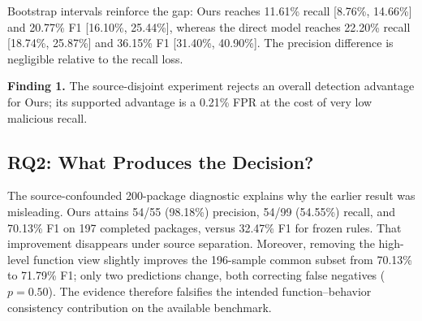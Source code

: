 \begin{table}[!t]
\centering
\caption{Source-disjoint results on 977 common successful packages. Counts
precede percentages; higher is better except FPR.}
\label{tab:source-disjoint}
\small
{}
\end{table}

Bootstrap intervals reinforce the gap: Ours reaches 11.61\% recall
[8.76\%, 14.66\%] and 20.77\% F1 [16.10\%, 25.44\%], whereas the direct model
reaches 22.20\% recall [18.74\%, 25.87\%] and 36.15\% F1 [31.40\%, 40.90\%].
The precision difference is negligible relative to the recall loss.

\noindent\textbf{Finding 1.} The source-disjoint experiment rejects an overall
detection advantage for Ours; its supported advantage is a 0.21\% FPR at the
cost of very low malicious recall.

\subsection{RQ2: What Produces the Decision?}

The source-confounded 200-package diagnostic explains why the earlier result
was misleading. Ours attains 54/55 (98.18\%) precision, 54/99 (54.55\%) recall,
and 70.13\% F1 on 197 completed packages, versus 32.47\% F1 for frozen rules.
That improvement disappears under source separation. Moreover, removing the
high-level function view slightly improves the 196-sample common subset from
70.13\% to 71.79\% F1; only two predictions change, both correcting false
negatives ($p=0.50$). The evidence therefore falsifies the intended
function--behavior consistency contribution on the available benchmark.

